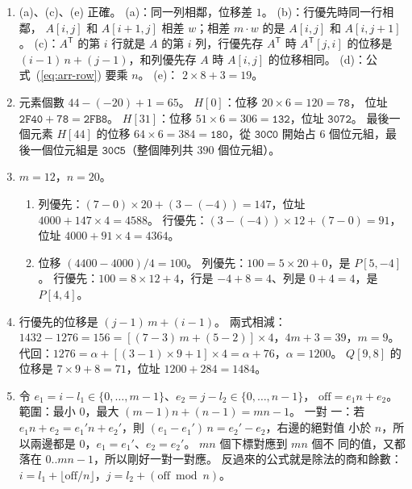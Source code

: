 \begin{enumerate}
\item (a)、(c)、(e) 正確。 (a)：同一列相鄰，位移差 $1$。 (b)：行優先時同一行相鄰，
$A[i, j]$ 和 $A[i + 1, j]$ 相差 $w$；相差 $m \cdot w$ 的是 $A[i, j]$ 和
$A[i, j + 1]$。 (c)：$A^{\mathsf T}$ 的第 $i$ 行就是 $A$ 的第 $i$ 列，行優先存
$A^{\mathsf T}$ 時 $A^{\mathsf T}[j, i]$ 的位移是 $(i - 1)\,n + (j - 1)$，和列優先存
$A$ 時 $A[i, j]$ 的位移相同。 (d)：公式~(\ref{eq:arr-row}) 要乘 $n$。 (e)：
$2 \times 8 + 3 = 19$。

\item 元素個數 $44 - (-20) + 1 = 65$。 $H[0]$：位移 $20 \times 6 = 120 = \texttt{78}$，
位址 $\texttt{2F40} + \texttt{78} = \texttt{2FB8}$。 $H[31]$：位移 $51 \times 6 = 306
= \texttt{132}$，位址 $\texttt{3072}$。 最後一個元素 $H[44]$ 的位移 $64 \times 6 = 384
= \texttt{180}$，從 $\texttt{30C0}$ 開始占 $6$ 個位元組，最後一個位元組是
$\texttt{30C5}$（整個陣列共 $390$ 個位元組）。

\item $m = 12$，$n = 20$。
\begin{enumerate}
\item 列優先：$(7 - 0) \times 20 + (3 - (-4)) = 147$，位址 $4000 + 147 \times 4 = 4588$。
行優先：$(3 - (-4)) \times 12 + (7 - 0) = 91$，位址 $4000 + 91 \times 4 = 4364$。
\item 位移 $(4400 - 4000)/4 = 100$。 列優先：$100 = 5 \times 20 + 0$，是 $P[5, -4]$。
行優先：$100 = 8 \times 12 + 4$，行是 $-4 + 8 = 4$、列是 $0 + 4 = 4$，是 $P[4, 4]$。
\end{enumerate}

\item 行優先的位移是 $(j - 1)\,m + (i - 1)$。 兩式相減：$1432 - 1276 = 156 =
[(7 - 3)\,m + (5 - 2)] \times 4$，$4m + 3 = 39$，$m = 9$。 代回：$1276 = \alpha + [(3 - 1)
\times 9 + 1] \times 4 = \alpha + 76$，$\alpha = 1200$。 $Q[9, 8]$ 的位移是
$7 \times 9 + 8 = 71$，位址 $1200 + 284 = 1484$。

\item 令 $e_1 = i - l_1 \in \{0, \ldots, m - 1\}$、$e_2 = j - l_2 \in \{0, \ldots, n - 1\}$，
$\mathrm{off} = e_1 n + e_2$。 範圍：最小 $0$，最大 $(m - 1)n + (n - 1) = mn - 1$。 一對
一：若 $e_1 n + e_2 = e_1' n + e_2'$，則 $(e_1 - e_1')\,n = e_2' - e_2$，右邊的絕對值
小於 $n$，所以兩邊都是 $0$，$e_1 = e_1'$、$e_2 = e_2'$。 $mn$ 個下標對應到 $mn$ 個不
同的值，又都落在 $0..mn - 1$，所以剛好一對一對應。 反過來的公式就是除法的商和餘數：
$i = l_1 + \lfloor \mathrm{off} / n \rfloor$，$j = l_2 + (\mathrm{off} \bmod n)$。


\end{enumerate}
